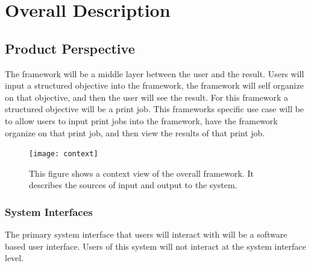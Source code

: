 \documentclass[draftclsnofoot, onecolumn, compsoc, 10pt]{IEEEtran}
\begin{document}

\section{Overall Description}
\subsection{Product Perspective}
The framework will be a middle layer between the user and the result. Users will input a structured objective into the framework, the framework will self organize on that objective, and then the user will see the result. For this framework a structured objective will be a print job. This frameworks specific use case will be to allow users to input print jobs into the framework, have the framework organize on that print job, and then view the results of that print job.


\begin{figure}[!htb]
\centering
	\texttt{[image: context]}
	\caption{This figure shows a context view of the overall framework. It describes the sources of input and output to the system.}
  
\end{figure}

\subsubsection{System Interfaces}
The primary system interface that users will interact with will be a software based user interface. Users of this system will not interact at the system interface level.

\end{document}
